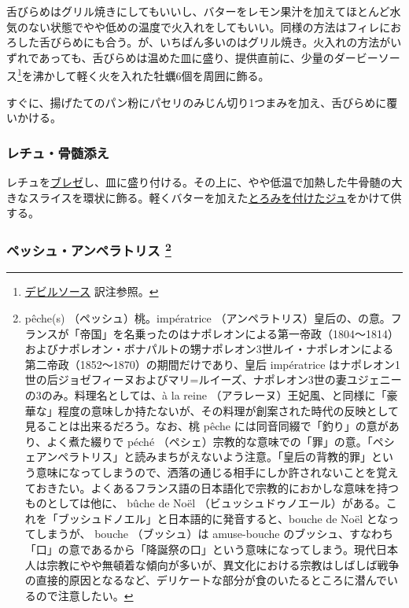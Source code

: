 
舌びらめはグリル焼きにしてもいいし、バターをレモン果汁を加えてほとんど水気のない状態でやや低めの温度で火入れをしてもいい。同様の方法はフィレにおろした舌びらめにも合う。が、いちばん多いのはグリル焼き。火入れの方法がいずれであっても、舌びらめは温めた皿に盛り、提供直前に、少量のダービーソース\footnote{\protect\hyperlink{devilled-sauce}{デビルソース}
  訳注参照。}を沸かして軽く火を入れた牡蠣6個を周囲に飾る。

すぐに、揚げたてのパン粉にパセリのみじん切り1つまみを加え、舌びらめに覆いかける。

\hypertarget{laitues-a-la-moelle}{%
\subsubsection{レチュ・骨髄添え}\label{laitues-a-la-moelle}}


レチュを\protect\hyperlink{braisage-des-legumes}{ブレゼ}し、皿に盛り付ける。その上に、やや低温で加熱した牛骨髄の大きなスライスを環状に飾る。軽くバターを加えた\protect\hyperlink{jus-de-veau-lie}{とろみを付けたジュ}をかけて供する。

\hypertarget{peches-imperatrice}{%
\subsubsection[ペッシュ・アンペラトリス
]{\texorpdfstring{ペッシュ・アンペラトリス \footnote{pêche(s)
  （ペッシュ）桃。impératrice
  （アンペラトリス）皇后の、の意。フランスが「帝国」を名乗ったのはナポレオンによる第一帝政（1804〜1814）およびナポレオン・ボナパルトの甥ナポレオン3世ルイ・ナポレオンによる第二帝政（1852〜1870）の期間だけであり、皇后
  impératrice
  はナポレオン1世の后ジョゼフィーヌおよびマリ=ルイーズ、ナポレオン3世の妻ユジェニーの3のみ。料理名としては、à
  la reine
  （アラレーヌ）王妃風、と同様に「豪華な」程度の意味しか持たないが、その料理が創案された時代の反映として見ることは出来るだろう。なお、桃
  pêche には同音同綴で「釣り」の意があり、よく煮た綴りで péché
  （ペシェ）宗教的な意味での「罪」の意。「ペシェアンペラトリス」と読みまちがえないよう注意。「皇后の背教的罪」という意味になってしまうので、洒落の通じる相手にしか許されないことを覚えておきたい。よくあるフランス語の日本語化で宗教的におかしな意味を持つものとしては他に、
  bûche de Noël
  （ビュッシュドゥノエール）がある。これを「ブッシュドノエル」と日本語的に発音すると、bouche
  de Noël となってしまうが、 bouche （ブッシュ）は amuse-bouche
  のブッシュ、すなわち「口」の意であるから「降誕祭の口」という意味になってしまう。現代日本人は宗教にやや無頓着な傾向が多いが、異文化における宗教はしばしば戦争の直接的原因となるなど、デリケートな部分が食のいたるところに潜んでいるので注意したい。}}{ペッシュ・アンペラトリス }}\label{peches-imperatrice}}

